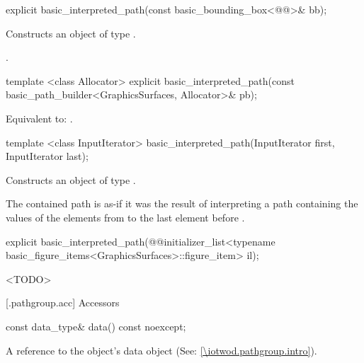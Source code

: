%
\begin{itemdecl}
explicit basic_interpreted_path(const basic_bounding_box<@\graphicsmathtemplparamnospace{}@>& bb);
\end{itemdecl}
\begin{itemdescr}
\pnum
\effects
Constructs an object of type .

\pnum
\postconditions
{}.
\end{itemdescr}

%
\begin{itemdecl}
template <class Allocator>
explicit basic_interpreted_path(const basic_path_builder<GraphicsSurfaces, Allocator>& pb);
\end{itemdecl}
\begin{itemdescr}
\pnum
\effects
Equivalent to: .	
\end{itemdescr}

%
\begin{itemdecl}
template <class InputIterator>
basic_interpreted_path(InputIterator first, InputIterator last);
\end{itemdecl}
\begin{itemdescr}
\pnum
\effects
Constructs an object of type .

\pnum
The contained path is as-if it was the result of interpreting a path containing the values of the elements from  to the last element before .
\end{itemdescr}

%
\begin{itemdecl}
explicit basic_interpreted_path(@\stdqualifier{}@initializer_list<typename
  basic_figure_items<GraphicsSurfaces>::figure_item> il);
\end{itemdecl}
\begin{itemdescr}
\pnum
\effects
<TODO>
\end{itemdescr}

 [\iotwod.pathgroup.acc] {Accessors}

%
\begin{itemdecl}
const data_type& data() const noexcept;
\end{itemdecl}
\begin{itemdescr}
\pnum
\returns A reference to the  object's data object (See: \ref{\iotwod.pathgroup.intro}).
\end{itemdescr}